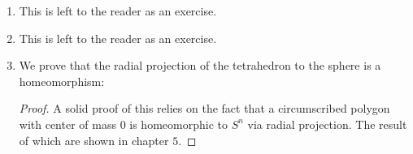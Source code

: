 \documentclass{book}
\begin{document}
\begin{enumerate}
\begin{proof}
            Next, consider $[0, 1/2) \subset [0,1)$. This is a open neighbourhood in $[0,1)$, by definition. But, $f[[0,1/2)]$ is $C$ intersected with the upper half of the plane minus $z = -1$. Which is not a neighbourhood of $z =1 \in C$, because any open ball centered around $z =1$ must contain the lower plane. Therefore, $f$ is not a homeomorphism. 
        \end{proof}

    \item This is left to the reader as an exercise.

    \item This is left to the reader as an exercise.

    \item We prove that the radial projection of the tetrahedron to the sphere is a homeomorphism: 
        \begin{proof} A solid proof of this relies on the fact that a circumscribed polygon with center of mass $0$ is homeomorphic to $S^n$ via radial projection. The result of which are shown in chapter $5$. 
        \end{proof}


\end{enumerate}
\end{document}
